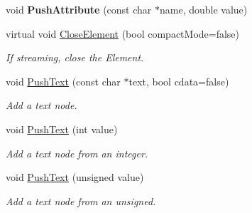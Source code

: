 \begin{DoxyCompactItemize}
\mbox{\label{classtinyxml2_1_1_x_m_l_printer_a1714867af40e68ca404c3e84b6cac2a6}} 
void {\bfseries Push\+Attribute} (const char $\ast$name, double value)
\item 
\mbox{\label{classtinyxml2_1_1_x_m_l_printer_af1fb439e5d800999646f333fa2f0699a}} 
virtual void \mbox{\hyperlink{classtinyxml2_1_1_x_m_l_printer_af1fb439e5d800999646f333fa2f0699a}{Close\+Element}} (bool compact\+Mode=false)
\begin{DoxyCompactList}\small\item\em If streaming, close the Element. \end{DoxyCompactList}\item 
\mbox{\label{classtinyxml2_1_1_x_m_l_printer_a1cc16a9362df4332012cb13cff6441b3}} 
void \mbox{\hyperlink{classtinyxml2_1_1_x_m_l_printer_a1cc16a9362df4332012cb13cff6441b3}{Push\+Text}} (const char $\ast$text, bool cdata=false)
\begin{DoxyCompactList}\small\item\em Add a text node. \end{DoxyCompactList}\item 
\mbox{\label{classtinyxml2_1_1_x_m_l_printer_a3e0d4d78de25d4cf081009e1431cea7e}} 
void \mbox{\hyperlink{classtinyxml2_1_1_x_m_l_printer_a3e0d4d78de25d4cf081009e1431cea7e}{Push\+Text}} (int value)
\begin{DoxyCompactList}\small\item\em Add a text node from an integer. \end{DoxyCompactList}\item 
\mbox{\label{classtinyxml2_1_1_x_m_l_printer_a661fb50e7e0a4918d2d259cb0fae647e}} 
void \mbox{\hyperlink{classtinyxml2_1_1_x_m_l_printer_a661fb50e7e0a4918d2d259cb0fae647e}{Push\+Text}} (unsigned value)
\begin{DoxyCompactList}\small\item\em Add a text node from an unsigned. \end{DoxyCompactList}\item 
\mbox{\label{classtinyxml2_1_1_x_m_l_printer_a96b0a0bfe105154a0a6c37d725258f0a}} 

\end{DoxyCompactItemize}
